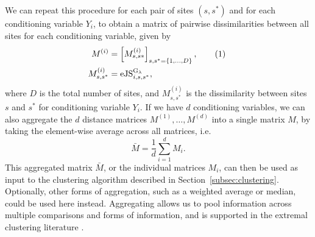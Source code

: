\documentclass[
  12pt]{article}
\newcommand{\eJSGa}[1]{\mathop{\mathrm{eJS}_{i, #1}^{\mathrm{G}_{\lambda}}}\nolimits}
\newcommand\numberthis{\addtocounter{equation}{1}\tag{\theequation}}
\begin{document}
We can repeat this procedure for each pair of sites $(s, s^*)$ and for each conditioning variable $Y_i$, to obtain a matrix of pairwise dissimilarities between all sites for each conditioning variable, given by
\begin{align*} %
  M^{(i)}&=\left[ M^{(i)}_{s, s*} \right]_{s, s^* = \{1, \ldots, D\}}, \numberthis~\label{eq:distance_matrix} \\
  M^{(i)}_{s, s^*} &= \eJSGa{s, s^*},
\end{align*}
where $D$ is the total number of sites, and $M^{(i)}_{s, s^*}$ is the dissimilarity between sites $s$ and $s^*$ for conditioning variable $Y_i$. 
If we have $d$ conditioning variables, we can also aggregate the $d$ distance matrices $M^{(1)}, \ldots, M^{(d)}$ into a single matrix $M$, by taking the element-wise average across all matrices, i.e. 
\begin{equation} \label{eq:aggregate_matrix}
  \bar{M} = \frac{1}{d} \sum_{i=1}^d M_i.
\end{equation}
This aggregated matrix $\bar{M}$, or the individual matrices $M_i$, can then be used as input to the clustering algorithm described in Section~\ref{subsec:clustering}.
Optionally, other forms of aggregation, such as a weighted average or median, could be used here instead. 
Aggregating allows us to pool information across multiple comparisons and forms of information, and is supported in the extremal clustering literature \citep{Mornet2017-is}.
\end{document}
